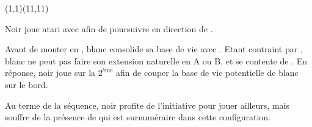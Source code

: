 \documentclass[preview, border=0pt, varwidth=false]{standalone}
\begin{document}
	\setgounit{0.6cm} 
	
\parbox[c][14.65cm][c]{10.2cm}{
	\centering
	
	\begin{psgopartialboard}{(1,1)(11,11)}
		\pass*
		\pass
	\end{psgopartialboard}
	
	\vspace{1em}	
Noir joue atari avec  afin de poursuivre en direction de . 

\bigskip

Avant de monter en , blanc consolide sa base de vie avec . Etant contraint par , blanc ne peut pas faire son extension naturelle en A ou B, et se contente de . En réponse, noir joue sur la $2^\text{ème}$ afin de couper la base de vie potentielle de blanc sur le bord.


\bigskip

Au terme de la séquence, noir profite de l'initiative pour jouer ailleurs, mais souffre de la présence de  qui est surnuméraire dans cette configuration.}
\end{document}
